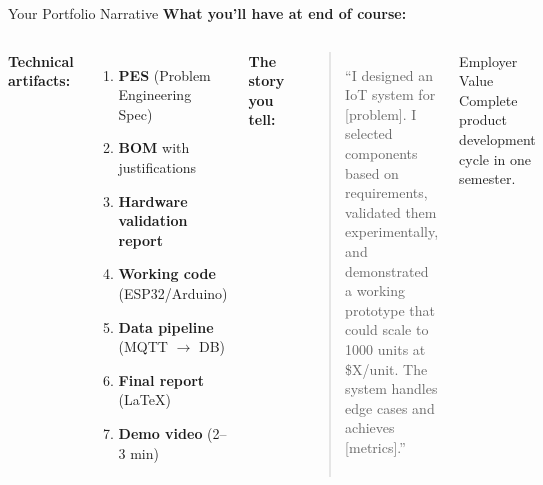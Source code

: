 \documentclass[aspectratio=169,11pt]{beamer}
\begin{document}
\begin{frame}[shrink=8]{Your Portfolio Narrative}
    \textbf{What you'll have at end of course:}
    
    \vspace{0.2cm}
    \begin{columns}
        \textbf{Technical artifacts:}
        \begin{enumerate}
            \item \textbf{PES} (Problem Engineering Spec)
            \item \textbf{BOM} with justifications
            \item \textbf{Hardware validation report}
            \item \textbf{Working code} (ESP32/Arduino)
            \item \textbf{Data pipeline} (MQTT $\rightarrow$ DB)
            \item \textbf{Final report} (LaTeX)
            \item \textbf{Demo video} (2--3 min)
        \end{enumerate}
        
        \textbf{The story you tell:}
        
        \vspace{0.15cm}
        \small
        \begin{quote}
            ``I designed an IoT system for [problem]. I selected components based on requirements, validated them experimentally, and demonstrated a working prototype that could scale to 1000 units at \$X/unit. The system handles edge cases and achieves [metrics].''
        \end{quote}
        \normalsize
        
        \vspace{0.15cm}
        \begin{alertblock}{Employer Value}
            Complete product development cycle in one semester.
        \end{alertblock}
    \end{columns}
\end{frame}
\end{document}
